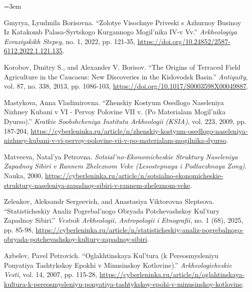 \IfFileExists{../../_shared/template/intellte.cls}{\documentclass[10pt,onecolumn]{../../_shared/template/intellte}}{\documentclass[10pt,onecolumn]{intellte}}
\newlength{\csllabelwidth}
\newenvironment{CSLReferences}[2]
 {\par\vspace{2pt}%
  \begin{list}{}{%
  \normalfont\rmfamily\mdseries\fontsize{10pt}{15pt}\selectfont\raggedright
  \hyphenpenalty=50\exhyphenpenalty=50\emergencystretch=3em%
  \renewcommand{\bibitem}[2][]{\item\hypertarget{##2}{}}%
  \setlength{\lineskiplimit}{-6pt}%
  \setlength{\leftmargin}{\csllabelwidth}%
  \setlength{\itemindent}{-\csllabelwidth}%
  \setlength{\labelwidth}{\csllabelwidth}%
  \setlength{\labelsep}{0pt}%
  \setlength{\parsep}{0pt}%
  \setlength{\topsep}{0pt}%
  \setlength{\partopsep}{0pt}%
  \setlength{\itemsep}{2pt}}}
 {\end{list}}
\newcommand{\CSLLeftMargin}[1]{\makebox[\csllabelwidth][l]{\normalfont\rmfamily\mdseries\fontsize{10pt}{15pt}\selectfont #1}}
\newcommand{\CSLRightInline}[1]{\normalfont\rmfamily\mdseries\fontsize{10pt}{15pt}\selectfont #1}
\begin{document}
\begin{CSLReferences}{0}{0}
\CSLLeftMargin{20. }%
\CSLRightInline{Gmyrya, Lyudmila Borisovna. {``Zolotye Visochnye
Priveski s Azhurnoy Businoy Iz Katakomb Palasa-Syrtskogo Kurgannogo
Mogil'nika IV-v Vv.''} \emph{Arkheologiya Evraziyskikh Stepey}, no. 1,
2022, pp. 121-35,
\url{https://doi.org/10.24852/2587-6112.2022.1.121.135}.}

\CSLLeftMargin{21. }%
\CSLRightInline{Korobov, Dmitry S., and Alexander V. Borisov. {``The
Origins of Terraced Field Agriculture in the Caucasus: New Discoveries
in the Kislovodsk Basin.''} \emph{Antiquity}, vol. 87, no. 338, 2013,
pp. 1086-103, \url{https://doi.org/10.1017/S0003598X00049887}.}

\CSLLeftMargin{22. }%
\CSLRightInline{Mastykova, Anna Vladimirovna. {``Zhenskiy Kostyum
Osedlogo Naseleniya Nizhney Kubani v VI - Pervoy Polovine VII v. (Po
Materialam Mogil'nika Dyurso).''} \emph{Kratkie Soobshcheniya Instituta
Arkheologii (KSIA)}, vol. 223, 2009, pp. 187-204,
\url{https://cyberleninka.ru/article/n/zhenskiy-kostyum-osedlogo-naseleniya-nizhney-kubani-v-vi-pervoy-polovine-vii-v-po-materialam-mogilnika-dyurso}.}

\CSLLeftMargin{23. }%
\CSLRightInline{Matveeva, Natal'ya Petrovna.
\emph{Sotsial'no-Ekonomicheskie Struktury Naseleniya Zapadnoy Sibiri v
Rannem Zheleznom Veke (Lesostepnaya i Podtaezhnaya Zony)}. Nauka, 2000,
\url{https://cyberleninka.ru/article/n/sotsialno-ekonomicheskie-struktury-naseleniya-zapadnoy-sibiri-v-rannem-zheleznom-veke}.}

\CSLLeftMargin{24. }%
\CSLRightInline{Zelenkov, Aleksandr Sergeevich, and Anastasiya
Viktorovna Sleptsova. {``Statisticheskiy Analiz Pogrebal'nogo Obryada
Potchevashskoy Kul'tury Zapadnoy Sibiri.''} \emph{Vestnik Arkheologii,
Antropologii i Etnografii}, no. 1 (68), 2025, pp. 85-98,
\url{https://cyberleninka.ru/article/n/statisticheskiy-analiz-pogrebalnogo-obryada-potchevashskoy-kultury-zapadnoy-sibiri}.}

\CSLLeftMargin{25. }%
\CSLRightInline{Azbelev, Pavel Petrovich. {``Oglakhtinskaya Kul'tura (k
Pereosmysleniyu Ponyatiya Tashtykskoy Epokhi v Minusinskoy
Kotlovine).''} \emph{Arkheologicheskie Vesti}, vol. 14, 2007, pp.
115-28,
\url{https://cyberleninka.ru/article/n/oglahtinskaya-kultura-k-pereosmysleniyu-ponyatiya-tashtykskoy-epohi-v-minusinskoy-kotlovine}.}


\end{CSLReferences}
\end{document}
